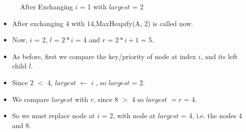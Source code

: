  
\begin{figure}[h]
\centering
{}
\caption{After Exchanging  $i$ = 1 with $largest$ = 2}
\end{figure}





\begin{itemize}
\item After exchanging 4 with 14,Max\textunderscore Heapify(A, 2) is called now.
\item Now, $i$ = 2, $l$ = $2*i$ = 4 and $r$ = $2*i + 1$ = 5.

\item As before, first we compare the key/priority of node at index $i$, and its left child $l$.
\item Since 2 $<$ 4, $largest$ $\gets$ $i$ , so $largest$ = 2.
\item We compare $largest$ with $r$, since 8 $>$ 4 so $largest$ $ = r$ = 4.
\item So we must replace node at $i$ = 2, with node at $largest$ = 4, i.e. the nodes 4 and 8.

\end{itemize}
